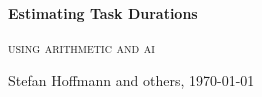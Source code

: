 \begin{titlepage}
	\centering
	\vspace*{5cm}
	{\huge\bfseries Estimating Task Durations\par}
	{\scshape\LARGE using arithmetic and ai\par}
	\vspace{2cm}
	{\Large\itshape \par}
	\vfill
	{\large Stefan Hoffmann and others, \today\par}
\end{titlepage}
